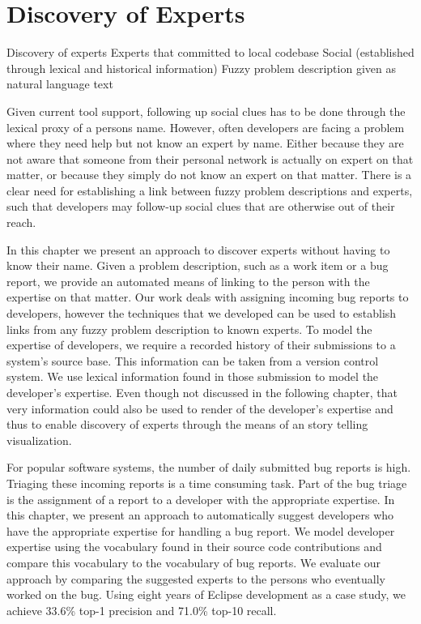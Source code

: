 
\chapter{Discovery of Experts}
\label{the chapter on bug reports}

\infobox
	{Discovery of experts}
	{Experts that committed to local codebase}
	{Social (established through lexical and historical information)}
	{Fuzzy problem description given as natural language text}

Given current tool support, following up social clues has to be done through the lexical proxy of a persons name. However, often developers are facing a problem where they need help but not know an expert by name. Either because they are not aware that someone from their personal network is actually on expert on that matter, or because they simply do not know an expert on that matter. There is a clear need for establishing a link between fuzzy problem descriptions and experts, such that developers may follow-up social clues that are otherwise out of their reach. 

In this chapter we present an approach to discover experts without having to know their name. Given a problem description, such as a work item or a bug report, we provide an automated means of linking to the person with the expertise on that matter. Our work deals with assigning incoming bug reports to developers, however the techniques that we developed can be used to establish links from any fuzzy problem description to known experts. To model the expertise of developers, we require a recorded history of their submissions to a system's source base. This information can be taken from a version control system. We use lexical information found in those submission to model the developer's expertise. Even though not discussed in the following chapter, that very information could also be used to render \EVOCLOUDS of the developer's expertise and thus to enable discovery of experts through the means of an story telling visualization.

\asteriskasteriskasterisk

For popular software systems, the number of daily submitted bug reports is high. Triaging these incoming reports is a time consuming task. Part of the bug triage is the assignment of a report to a developer with the appropriate expertise. In this chapter, we present an approach to automatically suggest developers who have the appropriate expertise for handling a bug report. We model developer expertise using the vocabulary found in their source code contributions and compare this vocabulary to the vocabulary of bug reports. We evaluate our approach by comparing the suggested experts to the persons who eventually worked on the bug. Using eight years of Eclipse development as a case study, we achieve 33.6\% top-1 precision and 71.0\% top-10 recall.

